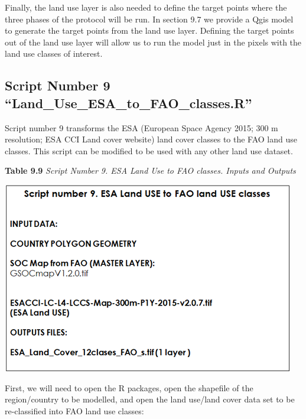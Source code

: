 \documentclass[
  10pt,
  b5paper,
]{book}
\begin{document}
Finally, the land use layer is also needed to define the target points where the three phases of the protocol will be run. In section 9.7 we provide a Qgis model to generate the target points from the land use layer. Defining the target points out of the land use layer will allow us to run the model just in the pixels with the land use classes of interest.

\hypertarget{script-number-9-land_use_esa_to_fao_classes.r}{%
\subsection{Script Number 9 ``Land\_Use\_ESA\_to\_FAO\_classes.R''}\label{script-number-9-land_use_esa_to_fao_classes.r}}

Script number 9 transforms the ESA (European Space Agency 2015; 300 m resolution; ESA CCI Land cover website) land cover classes to the FAO land use classes. This script can be modified to be used with any other land use dataset.

\textbf{Table 9.9} \emph{Script Number 9. ESA Land Use to FAO classes. Inputs and Outputs}

\includegraphics{tables/Table_9.8.png}

First, we will need to open the R packages, open the shapefile of the region/country to be modelled, and open the land use/land cover data set to be re-classified into FAO land use classes:
\end{document}
